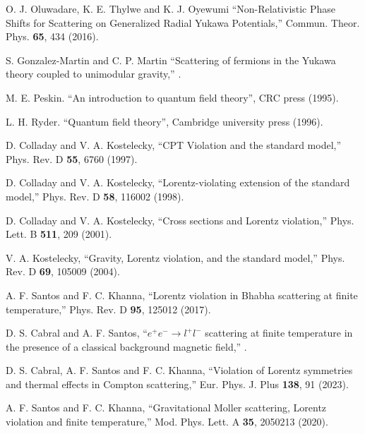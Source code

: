 \documentclass[11pt,showpacs,preprintnumbers,amsmath,amssymb,prd,nofootinbib,superscriptaddress]{revtex4-2}
\begin{document}
\begin{thebibliography}{99}
 O. J. Oluwadare, K. E. Thylwe and K. J. Oyewumi ``Non-Relativistic Phase Shifts for Scattering on Generalized Radial Yukawa Potentials,''  {{Commun. Theor. Phys.} {\bf 65}, 434 (2016)}.

 S. Gonzalez-Martin and C. P. Martin ``Scattering of fermions in the Yukawa theory coupled to unimodular gravity,'' .

 M. E. Peskin. ``An introduction to quantum field theory'', CRC press (1995).

 L. H. Ryder. ``Quantum field theory'', Cambridge university press (1996).

 D. Colladay and V. A. Kostelecky, ``CPT Violation and the standard model,''  {{Phys. Rev. D} {\bf 55}, 6760 (1997)}.

 D. Colladay and V. A. Kostelecky, ``Lorentz-violating extension of the standard model,''  {{Phys. Rev. D} {\bf 58}, 116002 (1998)}.

 D. Colladay and V. A. Kostelecky, ``Cross sections and Lorentz violation,''  {Phys. Lett. B \textbf{511}, 209 (2001)}.

 V. A. Kostelecky, ``Gravity, Lorentz violation, and the standard model,''  {Phys. Rev. D \textbf{69}, 105009 (2004)}.

 A. F. Santos and F. C. Khanna, ``Lorentz violation in Bhabha scattering at finite temperature,''  {{Phys. Rev. D} {\bf 95}, 125012 (2017)}.

 D. S. Cabral and A. F. Santos, ``$e^{+}e^{-}\to l^{+}l^{-}$  scattering at finite temperature in the presence of a classical background magnetic field,'' .

 D. S. Cabral, A. F. Santos and F. C. Khanna, ``Violation of Lorentz symmetries and thermal effects in Compton scattering,''  {Eur. Phys. J. Plus \textbf{138}, 91 (2023)}.

 A. F. Santos and F. C. Khanna, ``Gravitational Moller scattering, Lorentz violation and finite temperature,''  {Mod. Phys. Lett. A \textbf{35}, 2050213 (2020)}.


\end{thebibliography}
\end{document}
